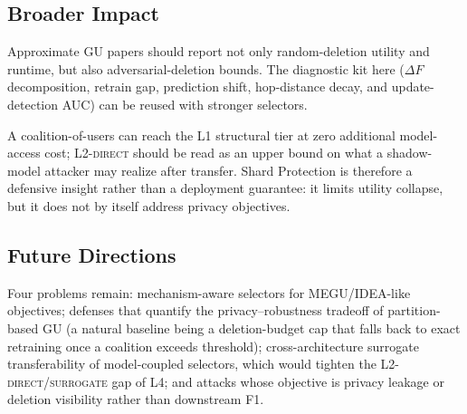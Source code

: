 \subsection{Broader Impact}
\label{sec:broader}

Approximate GU papers should report not only random-deletion utility and
runtime, but also adversarial-deletion bounds. The diagnostic kit here
($\Delta F$ decomposition, retrain gap, prediction shift, hop-distance
decay, and update-detection AUC) can be reused with stronger selectors.

A coalition-of-users can reach the L1 structural tier at zero additional
model-access cost; L2-\textsc{direct} should be read as an upper bound on
what a shadow-model attacker may realize after transfer. Shard Protection
is therefore a defensive insight rather than a deployment guarantee: it
limits utility collapse, but it does not by itself address privacy
objectives.

\subsection{Future Directions}
\label{sec:future}
Four problems remain: mechanism-aware selectors for MEGU/IDEA-like
objectives; defenses that quantify the privacy--robustness tradeoff of
partition-based GU (a natural baseline being a deletion-budget cap that
falls back to exact retraining once a coalition exceeds threshold);
cross-architecture surrogate transferability of model-coupled selectors,
which would tighten the L2-\textsc{direct}/\textsc{surrogate} gap of L4;
and attacks whose objective is privacy leakage or deletion visibility
rather than downstream F1.
